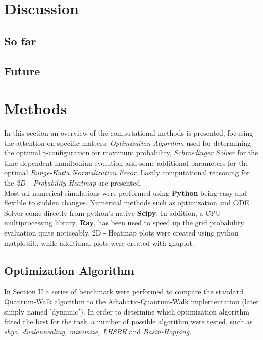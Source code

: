 \documentclass[aps,pra,reprint]{revtex4-2}
\begin{document}
\section{Discussion}
\subsection{So far}
\subsection{Future}


\section{Methods}
In this section an overview of the computational methods is presented, focusing the attention on specific matters: \textit{Optimization Algorithm} used for determining the optimal $\gamma$-configuration for maximum probability, \textit{Schroedinger Solver} for the time dependent hamiltonian evolution and some additional parameters for the optimal \textit{Runge-Kutta Normalization Error}. Lastly computational reasoning for the \textit{2D - Probability Heatmap} are presented. \\

Most all numerical simulations were performed using \textbf{Python} being easy and flexible to sudden changes. Numerical methods such as optimization and ODE Solver come directly from python's native \textbf{Scipy}. In addition, a CPU-multiprocessing library, \textbf{Ray}, has been used to speed up the grid probability evaluation quite noticeably. 2D - Heatmap plots were created using python matplotlib, while additional plots were created with gnuplot.

\subsection{Optimization Algorithm}
In Section II a series of benchmark were performed to compare the standard Quantum-Walk algorithm to the Adiabatic-Quantum-Walk implementation (later simply named 'dynamic'). In order to determine which optimization algorithm fitted the best for the task, a number of possible algorithm were tested, such as \textit{shgo, dualannealing, minimize, LHSBH} and \textit{Basin-Hopping}. \\
\end{document}

